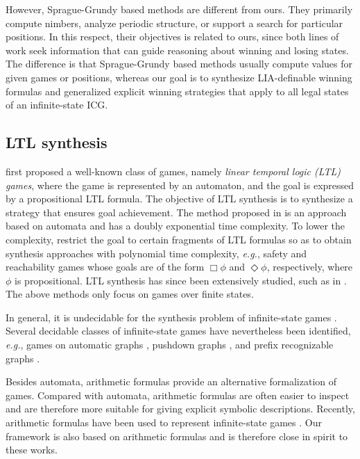 \documentclass[review]{elsarticle}
\newcommand\eg{{\it e.g.}}
\begin{document}
However, Sprague-Grundy based methods are different from ours. 
They primarily compute nimbers, analyze periodic structure, or support a search for particular positions.
In this respect, their objectives is related to ours, since both lines of work seek information that can guide reasoning about winning and losing states.
The difference is that Sprague-Grundy based methods usually compute values for given games or positions, whereas our goal is to synthesize LIA-definable winning formulas and generalized explicit winning strategies that apply to all legal states of an infinite-state ICG.



\subsection{LTL synthesis}
\citet{PnuR1989} first proposed a well-known class of games, namely \textit{linear temporal logic (LTL) games}, where the game is represented by an automaton, and the goal is expressed by a propositional LTL formula.
The objective of LTL synthesis is to synthesize a strategy that ensures goal achievement.
The method proposed in \cite{PnuR1989} is an approach based on automata and has a doubly exponential time complexity.
To lower the complexity, \citet{AsaMPS1998} restrict the goal to certain fragments of LTL formulas so as to obtain synthesis approaches with polynomial time complexity, \eg, safety and reachability games whose goals are of the form $\Box \phi$ and $\Diamond \phi$, respectively, where $\phi$ is propositional.
LTL synthesis has since been extensively studied, such as in \cite{NikAN2015,ZhuTLPV2017,CamMBM2018,GiaFLVX2022,BalFR2023,KreMPR2023}.
The above methods only focus on games over finite states. 

In general, it is undecidable for the synthesis problem of infinite-state games \cite{AlfHM2001}.
Several decidable classes of infinite-state games have nevertheless been identified, \eg, games on automatic graphs \cite{NeiT2016}, pushdown graphs \cite{Cac2002,ChaF2013}, and prefix recognizable graphs \cite{Cac2003}.

Besides automata, arithmetic formulas provide an alternative formalization of games.
Compared with automata, arithmetic formulas are often easier to inspect and are therefore more suitable for giving explicit symbolic descriptions.
Recently, arithmetic formulas have been used to represent infinite-state games \cite{BeyCPR2014,FarK2018,BaiCF2021,FaeP2023}.
Our framework is also based on arithmetic formulas and is therefore close in spirit to these works. 
\end{document}
